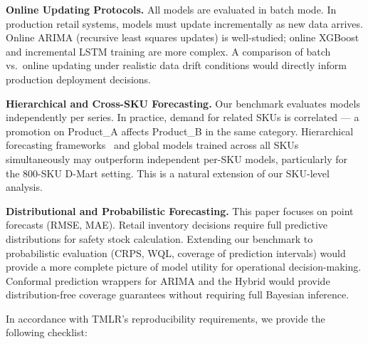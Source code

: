 \documentclass[journal]{IEEEtran}
\begin{document}
\textbf{Online Updating Protocols.}
All models are evaluated in batch mode. In production retail systems, models must update incrementally as new data arrives. Online ARIMA (recursive least squares updates) is well-studied; online XGBoost and incremental LSTM training are more complex. A comparison of batch vs.\ online updating under realistic data drift conditions would directly inform production deployment decisions.

\textbf{Hierarchical and Cross-SKU Forecasting.}
Our benchmark evaluates models independently per series. In practice, demand for related SKUs is correlated — a promotion on Product\_A affects Product\_B in the same category. Hierarchical forecasting frameworks~\cite{makridakis2022m5} and global models trained across all SKUs simultaneously may outperform independent per-SKU models, particularly for the 800-SKU D-Mart setting. This is a natural extension of our SKU-level analysis.

\textbf{Distributional and Probabilistic Forecasting.}
This paper focuses on point forecasts (RMSE, MAE). Retail inventory decisions require full predictive distributions for safety stock calculation. Extending our benchmark to probabilistic evaluation (CRPS, WQL, coverage of prediction intervals) would provide a more complete picture of model utility for operational decision-making. Conformal prediction wrappers for ARIMA and the Hybrid would provide distribution-free coverage guarantees without requiring full Bayesian inference.
\label{sec:repro}

In accordance with TMLR's reproducibility requirements, we provide the following checklist:
\end{document}

